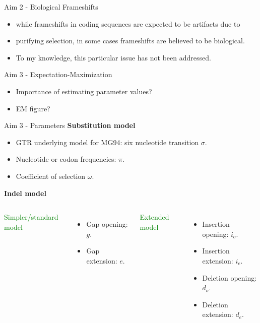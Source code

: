 \documentclass{beamer}
\newcommand{\green}[1]{\textcolor{green}{#1}}
\begin{document}
\begin{frame}{Aim 2 - Biological Frameshifts} %
\begin{itemize}
	\item while frameshifts in coding sequences are expected to be artifacts due to
	\item purifying selection, in some cases frameshifts are believed to be biological.
	\item To my knowledge, this particular issue has not been addressed.
\end{itemize}
\end{frame} %

\begin{frame}{Aim 3 - Expectation-Maximization} %
\begin{itemize}
	\item Importance of estimating parameter values?
	\item EM figure?
\end{itemize}
\end{frame} %

\begin{frame}{Aim 3 - Parameters} %
\textbf{Substitution model}
\begin{itemize}
	\item GTR underlying model for MG94: six nucleotide transition $\sigma$.
	\item Nucleotide or codon frequencies: $\pi$.
	\item Coefficient of selection $\omega$.
\end{itemize}

\vspace{2em}
\textbf{Indel model}
\begin{columns}[T]
\green{Simpler/standard model}
\begin{itemize}
	\item Gap opening: $g$.
	\item Gap extension: $e$.
\end{itemize}
\green{Extended model}
\begin{itemize}
	\item Insertion opening: $i_o$.
	\item Insertion extension: $i_e$.
	\item Deletion opening: $d_o$.
	\item Deletion extension: $d_e$.
\end{itemize}
\end{columns}
\end{frame} %
\end{document}
